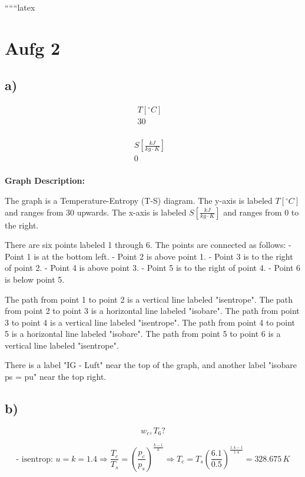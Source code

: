 
``````latex


\section*{Aufg 2}

\subsection*{a)}

\[
\begin{array}{c|c}
T [^\circ C] & \\
\hline
30 & \\
\end{array}
\]

\[
\begin{array}{c|c}
S \left[ \frac{kJ}{kg \cdot K} \right] & \\
\hline
0 & \\
\end{array}
\]

\textbf{Graph Description:}

The graph is a Temperature-Entropy (T-S) diagram. The y-axis is labeled \( T [^\circ C] \) and ranges from 30 upwards. The x-axis is labeled \( S \left[ \frac{kJ}{kg \cdot K} \right] \) and ranges from 0 to the right. 

There are six points labeled 1 through 6. The points are connected as follows:
- Point 1 is at the bottom left.
- Point 2 is above point 1.
- Point 3 is to the right of point 2.
- Point 4 is above point 3.
- Point 5 is to the right of point 4.
- Point 6 is below point 5.

The path from point 1 to point 2 is a vertical line labeled "isentrope". The path from point 2 to point 3 is a horizontal line labeled "isobare". The path from point 3 to point 4 is a vertical line labeled "isentrope". The path from point 4 to point 5 is a horizontal line labeled "isobare". The path from point 5 to point 6 is a vertical line labeled "isentrope".

There is a label "IG - Luft" near the top of the graph, and another label "isobare ps = pu" near the top right.

\subsection*{b)}

\[
w_c, T_6?
\]

\[
\text{- isentrop: } u = k = 1.4 \Rightarrow \frac{T_c}{T_s} = \left( \frac{p_c}{p_s} \right)^{\frac{k-1}{k}} \Rightarrow T_c = T_s \left( \frac{6.1}{0.5} \right)^{\frac{1.4-1}{1.4}} = 328.675 \, K
\]

